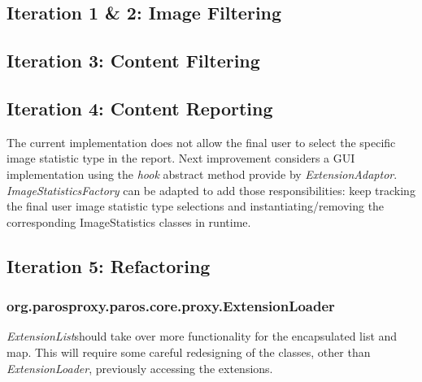 \subsection{Iteration 1 \& 2: Image Filtering}
\subsection{Iteration 3: Content Filtering}
\subsection{Iteration 4: Content Reporting}
The current implementation does not allow the final user to select the specific image statistic type in the report. Next improvement considers a GUI implementation using the \textit{hook} abstract method provide by \textit{ExtensionAdaptor}. \textit{ImageStatisticsFactory} can be adapted to add those responsibilities: keep tracking the final user image statistic type selections and instantiating/removing the corresponding ImageStatistics classes in runtime.

\subsection{Iteration 5: Refactoring}
\subsubsection{org.parosproxy.paros.core.proxy.ExtensionLoader}
\textit{ExtensionList}should take over more functionality for the encapsulated list and map. This will require some careful redesigning of the classes, other than \textit{ExtensionLoader}, previously accessing the extensions.
